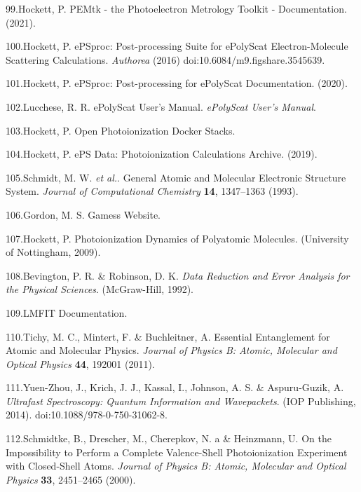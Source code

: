 \documentclass[10pt]{article}
\begin{document}
\label{csl:99}99.Hockett, P. {{{PEMtk}} - the {{Photoelectron Metrology Toolkit}} - Documentation}. (2021).

\label{csl:100}100.Hockett, P. {{{ePSproc}}: {{Post-processing}} Suite for {{ePolyScat}} Electron-Molecule Scattering Calculations}. \textit{Authorea} (2016) doi:10.6084/m9.figshare.3545639.

\label{csl:101}101.Hockett, P. {{{ePSproc}}: {{Post-processing}} for {{ePolyScat}} Documentation}. (2020).

\label{csl:102}102.Lucchese, R. R. {{{ePolyScat User}}'s {{Manual}}}. \textit{ePolyScat User's Manual}.

\label{csl:103}103.Hockett, P. {Open {{Photoionization Docker Stacks}}}.

\label{csl:104}104.Hockett, P. {{{ePS}} Data: {{Photoionization}} Calculations Archive}. (2019).

\label{csl:105}105.Schmidt, M. W. \textit{et al.}. {General Atomic and Molecular Electronic Structure System}. \textit{Journal of Computational Chemistry} \textbf{14}, 1347–1363 (1993).

\label{csl:106}106.Gordon, M. S. {Gamess Website}.

\label{csl:107}107.Hockett, P. {Photoionization Dynamics of Polyatomic Molecules}. (University of Nottingham, 2009).

\label{csl:108}108.Bevington, P. R. \& Robinson, D. K. \textit{{Data {{Reduction}} and {{Error Analysis}} for the {{Physical Sciences}}}}. ({McGraw-Hill}, 1992).

\label{csl:109}109.{{{LMFIT}} Documentation}.

\label{csl:110}110.Tichy, M. C., Mintert, F. \& Buchleitner, A. {Essential Entanglement for Atomic and Molecular Physics}. \textit{Journal of Physics B: Atomic, Molecular and Optical Physics} \textbf{44}, 192001 (2011).

\label{csl:111}111.{Yuen-Zhou}, J., Krich, J. J., Kassal, I., Johnson, A. S. \& {Aspuru-Guzik}, A. \textit{{Ultrafast {{Spectroscopy}}: {{Quantum Information}} and {{Wavepackets}}}}. ({IOP Publishing}, 2014). doi:10.1088/978-0-750-31062-8.

\label{csl:112}112.Schmidtke, B., Drescher, M., Cherepkov, N. a \& Heinzmann, U. {On the Impossibility to Perform a Complete Valence-Shell Photoionization Experiment with Closed-Shell Atoms}. \textit{Journal of Physics B: Atomic, Molecular and Optical Physics} \textbf{33}, 2451–2465 (2000).
\end{document}
